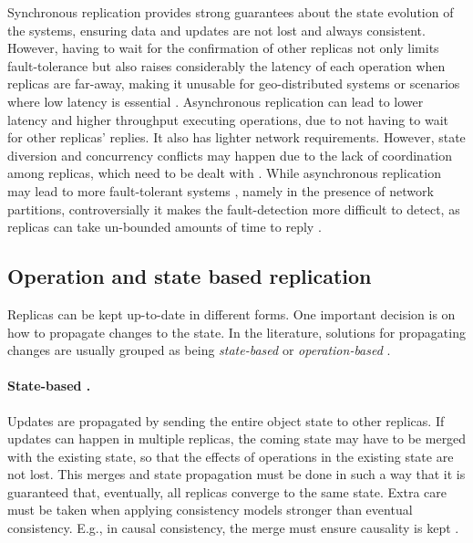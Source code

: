 Synchronous replication provides strong guarantees about the state evolution of the systems, ensuring data and updates are not lost and always consistent.
However, having to wait for the confirmation of other replicas not only limits fault-tolerance \cite{spanner} but also raises considerably the latency of each operation when replicas are far-away, making it unusable for geo-distributed systems or scenarios where low latency is essential \cite{slog}.
Asynchronous replication can lead to lower latency and higher throughput executing operations, due to not having to wait for other replicas' replies.
It also has lighter network requirements.
However, state diversion and concurrency conflicts may happen due to the lack of coordination among replicas, which need to be dealt with \cite{dynamo}.
While asynchronous replication may lead to more fault-tolerant systems \cite{dynamo, cassandra, cops}, namely in the presence of network partitions, controversially it makes the fault-detection more difficult to detect, as replicas can take un-bounded amounts of time to reply \cite{cap}.


\subsection{Operation and state based replication}

Replicas can be kept up-to-date in different forms.
One important decision is on how to propagate changes to the state.
In the literature, solutions for propagating changes are usually grouped as being \emph{state-based} or \emph{operation-based} \cite{crdt}.


\paragraph{State-based \cite{crdt}.} Updates are propagated by sending the entire object state to other replicas.
If updates can happen in multiple replicas, the coming state may have to be merged with the existing state, so that the effects of operations in the existing state are not lost.
This merges and state propagation must be done in such a way that it is guaranteed that, eventually, all replicas converge to the same state.
Extra care must be taken when applying consistency models stronger than eventual consistency.
E.g., in causal consistency, the merge must ensure causality is kept \cite{understandingEC}.

